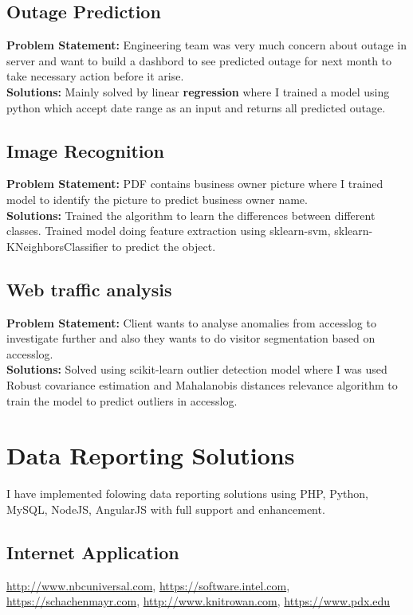 \documentclass{article}
\begin{document}
\subsection{Outage Prediction}
\textbf{Problem Statement:} Engineering team was very much concern about outage in server and want to build a dashbord to see predicted outage for next month to take necessary action before it arise.\\
\textbf{Solutions:} Mainly solved by linear \textbf{regression} where I trained a model using python which accept date range as an input and returns all predicted outage.

\subsection{Image Recognition}
\textbf{Problem Statement:} PDF contains business owner picture where I trained model to identify the picture to predict business owner name.\\
\textbf{Solutions:} Trained the algorithm to learn the differences between different classes. Trained model doing feature extraction using sklearn-svm, sklearn-KNeighborsClassifier to predict the object.

\subsection{Web traffic analysis}
\textbf{Problem Statement:} Client wants to analyse anomalies from accesslog to investigate further and also they wants to do visitor segmentation based on accesslog.\\
\textbf{Solutions:} Solved using scikit-learn outlier detection model where I was used Robust covariance estimation and Mahalanobis distances relevance algorithm to train the model to predict outliers in accesslog.

\section{Data Reporting Solutions}
I have implemented folowing data reporting solutions using PHP, Python, MySQL, NodeJS, AngularJS with full support and enhancement.
\subsection{Internet Application}
\url{http://www.nbcuniversal.com}, \url{https://software.intel.com}, \url{https://schachenmayr.com}, \url{http://www.knitrowan.com}, \url{https://www.pdx.edu}
\end{document}
